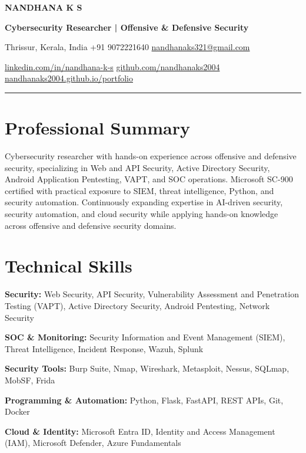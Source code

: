 \documentclass[10pt,a4paper]{article}
\begin{document}
{\centering
{\fontsize{22}{24}\selectfont\textbf{\color{navy}\MakeUppercase{NANDHANA K S}}}\par
\vspace{2.5pt}
{\fontsize{11}{12.5}\selectfont\textbf{\color{navy}Cybersecurity Researcher | Offensive \& Defensive Security}}\par
\vspace{4pt}
{\fontsize{8.5}{10}\selectfont
Thrissur, Kerala, India \quad\textbar\quad +91 9072221640 \quad\textbar\quad \href{mailto:nandhanaks321@gmail.com}{nandhanaks321@gmail.com}\par
\vspace{1.5pt}
\href{https://linkedin.com/in/nandhana-k-s}{linkedin.com/in/nandhana-k-s} \quad\textbar\quad
\href{https://github.com/nandhanaks2004}{github.com/nandhanaks2004} \quad\textbar\quad
\href{https://nandhanaks2004.github.io/portfolio}{nandhanaks2004.github.io/portfolio}\par}
\vspace{5pt}
{\color{navy}\noindent\rule{\textwidth}{0.6pt}}
\par}
\vspace{5pt}

\vspace{5pt}

\section{Professional Summary}
{\fontsize{9}{11}\selectfont
Cybersecurity researcher with hands-on experience across offensive and defensive security, specializing in Web and API Security, Active Directory Security, Android Application Pentesting, VAPT, and SOC operations. Microsoft SC-900 certified with practical exposure to SIEM, threat intelligence, Python, and security automation. Continuously expanding expertise in AI-driven security, security automation, and cloud security while applying hands-on knowledge across offensive and defensive security domains.}

\section{Technical Skills}
{\fontsize{8.5}{10}\selectfont
\textbf{Security:} Web Security, API Security, Vulnerability Assessment and Penetration Testing (VAPT), Active Directory Security, Android Pentesting, Network Security\par
\textbf{SOC \& Monitoring:} Security Information and Event Management (SIEM), Threat Intelligence, Incident Response, Wazuh, Splunk\par
\textbf{Security Tools:} Burp Suite, Nmap, Wireshark, Metasploit, Nessus, SQLmap, MobSF, Frida\par
\textbf{Programming \& Automation:} Python, Flask, FastAPI, REST APIs, Git, Docker\par
\textbf{Cloud \& Identity:} Microsoft Entra ID, Identity and Access Management (IAM), Microsoft Defender, Azure Fundamentals\par
}
\end{document}
